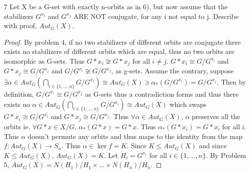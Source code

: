 \documentclass{article}
\begin{document}
\begin{PROB}{7}\label{Problem 7.}
    Let X be a G-set with exactly n-orbits as in 6), but now assume that the stabilizers $G^{x_i}$ and $G^{x_j}$ ARE NOT conjugate, for any i not equal to j.  Describe with proof, $Aut_G(X)$.
\end{PROB}
\begin{proof}
    By problem 4, if no two stabilizers of different orbits are conjugate there exists no stabilizers of different orbits which are equal, thus no two orbits are isomorphic as G-sets. Thus $G \ast x_i \not \cong G \ast x_j$ for all $i \neq j$. $G \ast x_i \cong G/G^{x_i}$ and $G \ast x_j \cong G/G^{x_j}$ and $G/G^{x_i} \not \cong G/G^{x_j}$, as g-sets. Assume the contrary, suppose $\exists \alpha \in Aut_G(\bigcap_{i \in \{1, \ldots, n\}} G/G^{x_i}) \cong Aut_G(X) \ni \alpha_*(G/G^{x_i}) = G/G^{x_j}$. Then by definition, $G/G^{x_i} \cong G/G^{x_j}$ as G-sets thus a contradiction forms and thus there exists no $\alpha \in Aut_G(\bigcap_{i \in \{1, \ldots, n\}} G/G^{x_i}) \cong Aut_G(X)$ which swaps $G \ast x_i \cong G/G^{x_i}$ and $G \ast x_j \cong G/G^{x_j}$. Thus $\forall \alpha \in Aut_G(X)$, $\alpha$ preserves all the orbits ie. $\forall G \ast x \in X/G$, $\alpha_*(G \ast x) = G \ast x$. Thus $\alpha_*(G \ast x_i) = G \ast x_i$ for all i. Thus $\alpha$ doesn't permute any orbits and thus maps to the identity from the map $f: Aut_G(X) \to S_n$. Thus $\alpha \in \ker f = K$. Since $K \leq Aut_G(X)$ and since $K \leq Aut_G(X)$, $Aut_G(X) = K$. Let $H_i = G^{x_i}$ for all $i \in \{1, \ldots, n\}$. By Problem 5, $Aut_G(X) = N(H_1)/H_1 \times \ldots \times N(H_n)/H_n$.
\end{proof}

\bigskip
\end{document}
